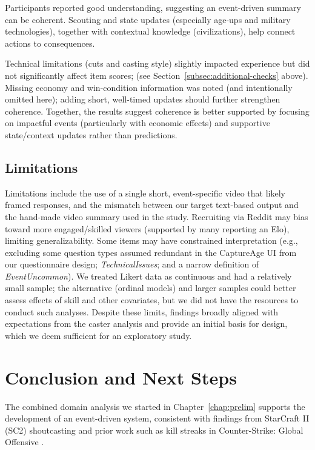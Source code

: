 Participants reported good understanding, suggesting an event-driven summary can be coherent. Scouting and state updates (especially age-ups and military technologies), together with contextual knowledge (civilizations), help connect actions to consequences.

Technical limitations (cuts and casting style) slightly impacted experience but did not significantly affect item scores; (see Section~\ref{subsec:additional-checks} above). Missing economy and win-condition information was noted (and intentionally omitted here); adding short, well-timed updates should further strengthen coherence. Together, the results suggest coherence is better supported by focusing on impactful events (particularly with economic effects) and supportive state/context updates rather than predictions.

\subsection{Limitations}
Limitations include the use of a single short, event-specific video that likely framed responses, and the mismatch between our target text-based output and the hand-made video summary used in the study. Recruiting via Reddit may bias toward more engaged/skilled viewers (supported by many reporting an Elo), limiting generalizability.
Some items may have constrained interpretation (e.g., excluding some question types assumed redundant in the CaptureAge UI from our questionnaire design; \textit{TechnicalIssues}; and a narrow definition of \textit{EventUncommon}). We treated Likert data as continuous and had a relatively small sample; the alternative (ordinal models) and larger samples could better assess effects of skill and other covariates, but we did not have the resources to conduct such analyses. Despite these limits, findings broadly aligned with expectations from the caster analysis and provide an initial basis for design, which we deem sufficient for an exploratory study.

\section{Conclusion and Next Steps}
The combined domain analysis we started in Chapter~\ref{chap:prelim} supports the development of an event-driven system, consistent with findings from StarCraft II (SC2) shoutcasting \cite{dodge2018} and prior work such as kill streaks in Counter-Strike: Global Offensive \cite{lux2019a, wutti2018}.

